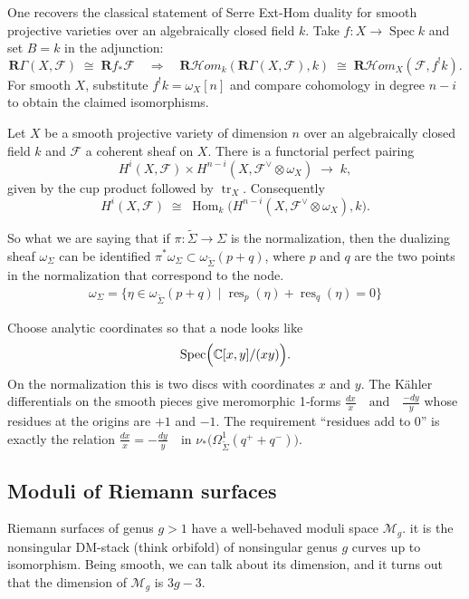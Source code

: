 \documentclass[12pt]{article}
\begin{document}
One recovers the classical statement of Serre Ext-Hom duality for smooth projective varieties over an algebraically closed field $k$. Take $f:X\to\operatorname{Spec}k$ and set $B=k$ in the adjunction:
\[
\mathbf R\Gamma(X,\mathcal F)\;\cong\;\mathbf R f_*\mathcal F
\quad\Longrightarrow\quad
\mathbf R\!\mathcal Hom_k(\mathbf R\Gamma(X,\mathcal F),k)
\;\cong\;
\mathbf R\!\mathcal Hom_X(\mathcal F,f^{!}k).
\]
For smooth $X$, substitute $f^{!}k=\omega_X[n]$ and compare cohomology in degree $n-i$ to obtain the claimed isomorphisms.
\begin{theorem}
Let $X$ be a smooth projective variety of dimension $n$ over an algebraically closed field $k$ and $\mathcal F$ a coherent sheaf on $X$.  There is a functorial perfect pairing
\[
H^{i}(X,\mathcal F)\times H^{n-i}(X,\mathcal F^{\vee}\otimes\omega_X)\;\longrightarrow\;k,
\]
given by the cup product followed by $\operatorname{tr}_X$.  Consequently
\[
H^{i}(X,\mathcal F)\;\cong\; \operatorname{Hom}_k\!\bigl(H^{n-i}(X,\mathcal F^{\vee}\otimes\omega_X),k\bigr).
\]
\end{theorem}

So what we are saying that if $\pi:\tilde \Sigma \to \Sigma$ is the normalization, then the dualizing sheaf $\omega_\Sigma$ can be identified $\pi^*\omega_{\Sigma} \subset \omega_{\widetilde{\Sigma}}(p + q)$, where $p$ and $q$ are the two points in the normalization that correspond to the node.
\begin{align*} 
    \omega_\Sigma = \{ \eta \in \omega_{\widetilde{\Sigma}}(p + q) \mid \operatorname{res}_p(\eta) + \operatorname{res}_q(\eta) = 0 \}
\end{align*}

Choose analytic coordinates so that a node looks like
\[
\operatorname{Spec}\Bigl(\mathbb{C}[x,y]/(xy)\Bigr).
\]
On the normalization this is two discs with coordinates $x$ and $y$.
The Kähler differentials on the smooth pieces give meromorphic 1‑forms
$\frac{dx}{x} \quad \text{and} \quad \frac{-dy}{y}$
whose residues at the origins are $+1$ and $-1$.
The requirement ``residues add to 0'' is exactly the relation
$\frac{dx}{x} = -\frac{dy}{y}
\quad \text{in } \nu_{*}\bigl(\Omega^{1}_{\widetilde{\Sigma}}(q^{+} + q^{-})\bigr).
$

\subsection{Moduli of Riemann surfaces}
Riemann surfaces of genus $g>1$ have a well-behaved moduli space $\mathcal{M}_g$. it is the nonsingular DM-stack (think orbifold) of nonsingular genus $g$ curves up to isomorphism. Being smooth, we can talk about its dimension, and it turns out that the dimension of $\mathcal{M}_g$ is $3g-3$.
\end{document}
